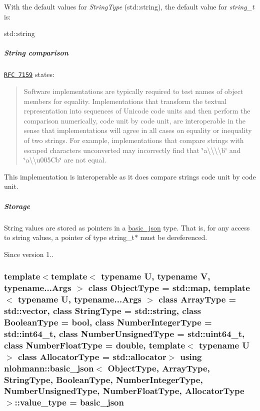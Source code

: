 With the default values for {\itshape String\-Type} ({\ttfamily std\-::string}), the default value for {\itshape string\-\_\-t} is\-:


\begin{DoxyCode}
std::string
\end{DoxyCode}


\subparagraph*{String comparison}

\href{http://rfc7159.net/rfc7159}{\tt R\-F\-C 7159} states\-: \begin{quotation}
Software implementations are typically required to test names of object members for equality. Implementations that transform the textual representation into sequences of Unicode code units and then perform the comparison numerically, code unit by code unit, are interoperable in the sense that implementations will agree in all cases on equality or inequality of two strings. For example, implementations that compare strings with escaped characters unconverted may incorrectly find that {\ttfamily \char`\"{}a\textbackslash{}\textbackslash{}\textbackslash{}\textbackslash{}b\char`\"{}} and {\ttfamily \char`\"{}a\textbackslash{}\textbackslash{}u005\-Cb\char`\"{}} are not equal.

\end{quotation}


This implementation is interoperable as it does compare strings code unit by code unit.

\subparagraph*{Storage}

String values are stored as pointers in a \hyperlink{classnlohmann_1_1basic__json}{basic\-\_\-json} type. That is, for any access to string values, a pointer of type {\ttfamily string\-\_\-t$\ast$} must be dereferenced.

\begin{DoxySince}{Since}
version 1.. 
\end{DoxySince}
\hypertarget{classnlohmann_1_1basic__json_ac8d45b57874b4a6e9c07f7d3b5daa1f9}{
\subsubsection[{value\-\_\-type}]{\setlength{\rightskip}{0pt plus 5cm}template$<$template$<$ typename U, typename V, typename...\-Args $>$ class Object\-Type = std\-::map, template$<$ typename U, typename...\-Args $>$ class Array\-Type = std\-::vector, class String\-Type  = std\-::string, class Boolean\-Type  = bool, class Number\-Integer\-Type  = std\-::int64\-\_\-t, class Number\-Unsigned\-Type  = std\-::uint64\-\_\-t, class Number\-Float\-Type  = double, template$<$ typename U $>$ class Allocator\-Type = std\-::allocator$>$ using {\bf nlohmann\-::basic\-\_\-json}$<$ Object\-Type, Array\-Type, String\-Type, Boolean\-Type, Number\-Integer\-Type, Number\-Unsigned\-Type, Number\-Float\-Type, Allocator\-Type $>$\-::{\bf value\-\_\-type} =  {\bf basic\-\_\-json}}}\label{classnlohmann_1_1basic__json_ac8d45b57874b4a6e9c07f7d3b5daa1f9}



